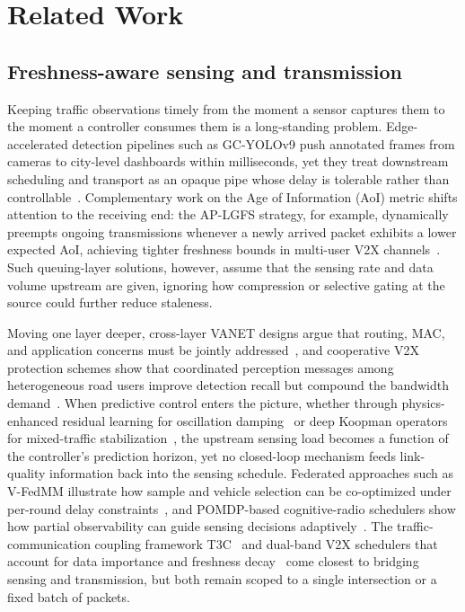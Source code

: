 \documentclass[final,3p,times,review,sort&compress]{elsarticle}
\begin{document}
\section{Related Work}
\label{sec:related}

\subsection{Freshness-aware sensing and transmission}
Keeping traffic observations timely from the moment a sensor captures them to the moment a controller consumes them is a long-standing problem.  Edge-accelerated detection pipelines such as GC-YOLOv9 push annotated frames from cameras to city-level dashboards within milliseconds, yet they treat downstream scheduling and transport as an opaque pipe whose delay is tolerable rather than controllable~\cite{AN2024277}.  Complementary work on the Age of Information (AoI) metric shifts attention to the receiving end: the AP-LGFS strategy, for example, dynamically preempts ongoing transmissions whenever a newly arrived packet exhibits a lower expected AoI, achieving tighter freshness bounds in multi-user V2X channels~\cite{MOHAMMED2025111706}.  Such queuing-layer solutions, however, assume that the sensing rate and data volume upstream are given, ignoring how compression or selective gating at the source could further reduce staleness.

Moving one layer deeper, cross-layer VANET designs argue that routing, MAC, and application concerns must be jointly addressed~\cite{JARUPAN2011966}, and cooperative V2X protection schemes show that coordinated perception messages among heterogeneous road users improve detection recall but compound the bandwidth demand~\cite{HEJAZI2024110396}.  When predictive control enters the picture, whether through physics-enhanced residual learning for oscillation damping~\cite{LONG2024100154} or deep Koopman operators for mixed-traffic stabilization~\cite{LYU2026104258}, the upstream sensing load becomes a function of the controller's prediction horizon, yet no closed-loop mechanism feeds link-quality information back into the sensing schedule.  Federated approaches such as V-FedMM illustrate how sample and vehicle selection can be co-optimized under per-round delay constraints~\cite{TU2026112020}, and POMDP-based cognitive-radio schedulers show how partial observability can guide sensing decisions adaptively~\cite{JEON20123318}.  The traffic-communication coupling framework T3C~\cite{WU2024104886} and dual-band V2X schedulers that account for data importance and freshness decay~\cite{HE2023100610} come closest to bridging sensing and transmission, but both remain scoped to a single intersection or a fixed batch of packets.
\end{document}
